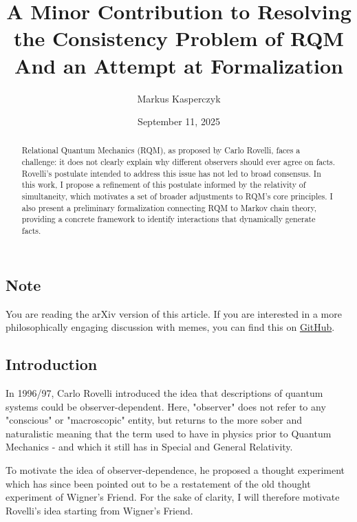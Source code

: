\documentclass{article}
\title{A Minor Contribution to Resolving the Consistency Problem of RQM \\ \large And an Attempt at Formalization}
\author{Markus Kasperczyk}
\date{September 11, 2025}
\begin{document}
\maketitle

\newpage

\begin{abstract}
Relational Quantum Mechanics (RQM), as proposed by Carlo Rovelli, faces a challenge: it does not clearly explain why different observers should ever agree on facts. Rovelli's postulate intended to address this issue has not led to broad consensus. In this work, I propose a refinement of this postulate informed by the relativity of simultaneity, which motivates a set of broader adjustments to RQM’s core principles. I also present a preliminary formalization connecting RQM to Markov chain theory, providing a concrete framework to identify interactions that dynamically generate facts.
\end{abstract}

\newpage

\subsection*{Note}

You are reading the arXiv version of this article. If you are interested in a more philosophically engaging discussion with memes, you can find this on \href{https://github.com/GermanBrainRot/Project-Galileo/tree/for-western-audiences}{GitHub}.

\newpage

\tableofcontents

\pagebreak

\subsection*{Introduction}

In 1996/97, Carlo Rovelli introduced \cite{Rovelli_1996} the idea that descriptions of quantum systems could be observer-dependent. Here, "observer" does not refer to any "conscious" or "macroscopic" entity, but returns to the more sober and naturalistic meaning that the term used to have in physics prior to Quantum Mechanics - and which it still has in Special and General Relativity.

To motivate the idea of observer-dependence, he proposed a thought experiment which has since been pointed out \cite{laudisa2017openproblemsrelationalquantum} to be a restatement of the old thought experiment of Wigner's Friend. For the sake of clarity, I will therefore motivate Rovelli's idea starting from Wigner's Friend.
\end{document}
